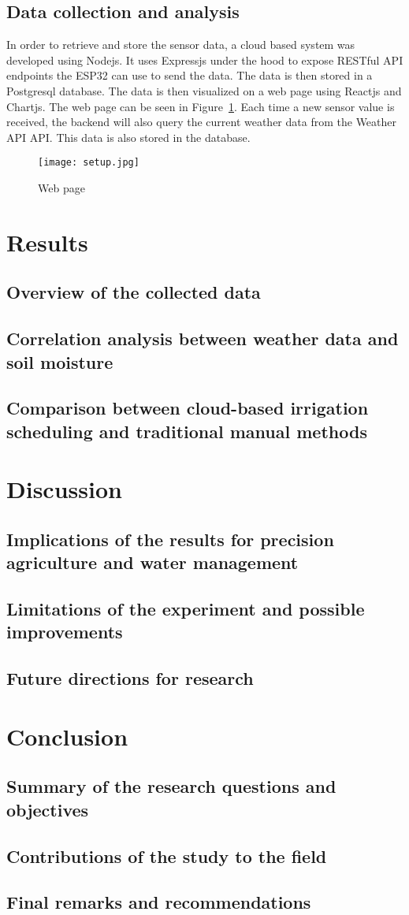 \documentclass[11pt]{scrartcl} %
\begin{document}
\subsection{Data collection and analysis}
\label{sec:data_collection}
In order to retrieve and store the sensor data, a cloud based system was developed using \gls{Nodejs}. It uses \gls{Expressjs} under the hood to expose RESTful API endpoints the ESP32 can use to send the data. The data is then stored in a \gls{Postgresql} database. The data is then visualized on a web page using \gls{Reactjs} and \gls{Chartjs}. The web page can be seen in Figure~\ref{fig:web_page}.
Each time a new sensor value is received, the backend will also query the current weather data from the \gls{Weather API} API. This data is also stored in the database.
\begin{figure}[h]
	\centering
	\texttt{[image: setup.jpg]}
	\caption{Web page}
	\label{fig:web_page}
\end{figure}

\section{Results}
\subsection{Overview of the collected data}
\subsection{Correlation analysis between weather data and soil moisture}
\subsection{Comparison between cloud-based irrigation scheduling and traditional manual methods}
\section{Discussion}
\subsection{Implications of the results for precision agriculture and water management}
\subsection{Limitations of the experiment and possible improvements}
\subsection{Future directions for research}
\section{Conclusion}
\subsection{Summary of the research questions and objectives}
\subsection{Contributions of the study to the field}
\subsection{Final remarks and recommendations}


\newpage
\printbibliography[title=References]
\end{document}

